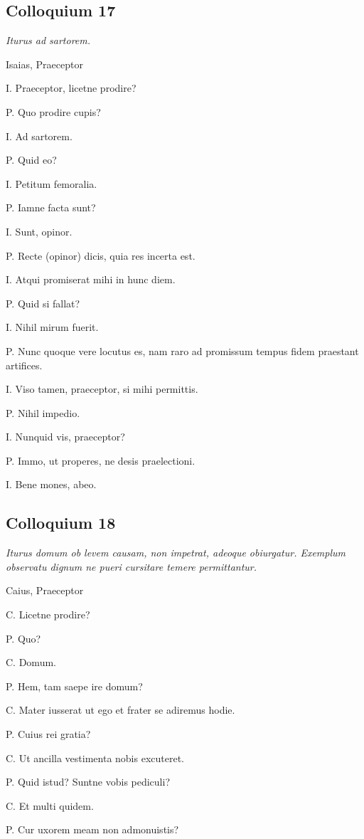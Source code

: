 \documentclass{article}
\begin{document}
\subsection{Colloquium 17}
\emph{Iturus ad sartorem.}

Isaias, Praeceptor

I. Praeceptor, licetne prodire?

P. Quo prodire cupis?

I. Ad sartorem.

P. Quid eo?

I. Petitum femoralia.

P. Iamne facta sunt?

I. Sunt, opinor.

P. Recte (opinor) dicis, quia res incerta est.

I. Atqui promiserat mihi in hunc diem.

P. Quid si fallat?

I. Nihil mirum fuerit.

P. Nunc quoque vere locutus es, nam raro ad promissum tempus fidem praestant artifices.

I. Viso tamen, praeceptor, si mihi permittis.

P. Nihil impedio.

I. Nunquid vis, praeceptor?

P. Immo, ut properes, ne desis praelectioni.

I. Bene mones, abeo.

\subsection{Colloquium 18}
\emph{Iturus domum ob levem causam, non impetrat, adeoque obiurgatur. Exemplum observatu dignum ne pueri cursitare temere permittantur.}

Caius, Praeceptor

C. Licetne prodire?

P. Quo?

C. Domum.

P. Hem, tam saepe ire domum?

C. Mater iusserat ut ego et frater se adiremus hodie.

P. Cuius rei gratia?

C. Ut ancilla vestimenta nobis excuteret.

P. Quid istud? Suntne vobis pediculi?

C. Et multi quidem.

P. Cur uxorem meam non admonuistis?
\end{document}

